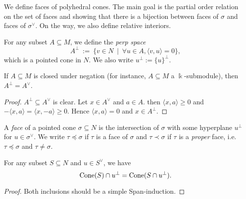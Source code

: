 We define faces of polyhedral cones. The main goal is the partial
order relation on the set of faces and showing that there is a
bijection between faces of \( \sigma \) and faces of \( \sigma^{\vee}
\). On the way, we also define relative interiors.

\begin{definition}
  \label{3-perp}
  \uses{}
  For any subset \( A \subseteq M \), we define the \emph{perp space}
  \[
      A^{\perp}\ :=\ \{v \in N\ \mid\ \forall u \in A, \langle v, u \rangle = 0\},
  \]
  which is a pointed cone in \( N \). We also write \( u^{\perp} :=
  \{u\}^{\perp} \).
\end{definition}

\begin{lemma}
  \label{3-perp-closed-negation}
  \uses{}
  If \( A \subseteq M \) is closed under negation (for instance, \( A
  \subseteq M \) a \( \Bbbk \)-submodule), then \( A^{\perp} =
  A^{\vee} \).
\end{lemma}
\begin{proof}
  \uses{}
  \( A^{\perp} \subseteq A^{\vee} \) is clear. Let \( x \in A^{\vee}
  \) and \( a \in A \). then \( \langle x, a \rangle \geq 0 \) and \(
  -\langle x, a \rangle = \langle x, -a \rangle \geq 0 \). Hence \(
  \langle x, a \rangle = 0 \) and \( x \in A^{\perp} \).
\end{proof}


\begin{definition}
  \label{3-face}
  A \emph{face} of a pointed cone \( \sigma \subseteq N \) is the
  intersection of \( \sigma \) with some hyperplane \( u^{\perp} \)
  for \( u \in \sigma^{\vee} \). We write \( \tau \preceq \sigma \) if
  \( \tau \) is a face of \( \sigma \) and \( \tau \prec \sigma \) if
  \( \tau \) is a \emph{proper} face, i.e. \( \tau \preceq \sigma \)
  and \( \tau \neq \sigma \).
\end{definition}

\begin{proposition}
  \label{3-cone-inter-perp}
  For any subset \( S \subseteq N \) and \( u \in S^{\vee} \), we have
  \[
      \operatorname{Cone}(S) \cap u^{\perp} = \operatorname{Cone}(S \cap u^{\perp}).
  \]
\end{proposition}
\begin{proof}
    Both inclusions should be a simple Span-induction.
\end{proof}

